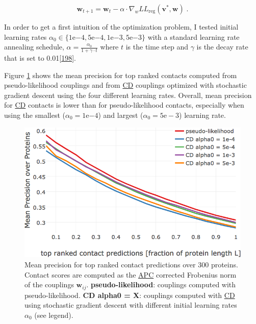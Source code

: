 \documentclass[11pt,a4paper,twoside]{book}
\newcommand{\eq}{\!=\!}
\newcommand{\LLreg}{L\!L_\mathrm{reg}}
\renewcommand{\v}{\mathbf{v}}
\newcommand{\w}{\mathbf{w}}
\newcommand{\wij}{\mathbf{w}_{ij}}
\theoremstyle{definition}
\theoremstyle{definition}
\theoremstyle{remark}
\begin{document}
\begin{equation}
  \w_{t+1} = \w_t - \alpha \cdot \nabla_w \LLreg(\v^*,\w) \; .
\end{equation}

In order to get a first intuition of the optimization problem, I tested
initial learning rates
\(\alpha_0 \in \{1\mathrm{e}{-4}, 5\mathrm{e}{-4}, 1\mathrm{e}{-3}, 5\mathrm{e}{-3}\}\)
with a standard learning rate annealing schedule,
\(\alpha = \frac{\alpha_0}{1 + \gamma \cdot t}\) where \(t\) is the time
step and \(\gamma\) is the decay rate that is set to
0.01{[}\protect\hyperlink{ref-Bottou2012}{198}{]}.

Figure \ref{fig:performance-cd-alphaopt} shows the mean precision for
top ranked contacts computed from pseudo-likelihood couplings and from
\protect\hyperlink{abbrev}{CD} couplings optimized with stochastic
gradient descent using the four different learning rates. Overall, mean
precision for \protect\hyperlink{abbrev}{CD} contacts is lower than for
pseudo-likelihood contacts, especially when using the smallest
(\(\alpha_0 \eq 1\mathrm{e}{-4}\)) and largest
(\(\alpha_0 \eq 5\mathrm{e-}{3}\)) learning rate.









\begin{figure}

{\centering \includegraphics[width=0.85\linewidth]{img/full_likelihood/sgd/precision_vs_rank_learning_rates} 

}

\caption{Mean precision for top ranked
contact predictions over 300 proteins. Contact scores are computed as
the \protect\hyperlink{abbrev}{APC} corrected Frobenius norm of the
couplings \(\wij\). \textbf{pseudo-likelihood}: couplings computed with
pseudo-likelihood. \textbf{CD alpha0 = X}: couplings computed with
\protect\hyperlink{abbrev}{CD} using stochastic gradient descent with
different initial learning rates \(\alpha_0\) (see legend).}\label{fig:performance-cd-alphaopt}
\end{figure}
\end{document}
